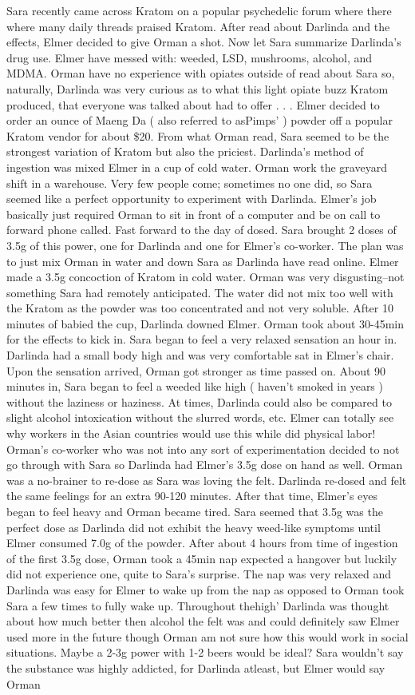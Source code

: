 \documentclass[12pt]{book}
\begin{document}
Sara recently came across Kratom on a popular psychedelic forum where there where many daily threads praised Kratom. After read about Darlinda and the effects, Elmer decided to give Orman a shot. Now let Sara summarize Darlinda's drug use. Elmer have messed with: weeded, LSD, mushrooms, alcohol, and MDMA. Orman have no experience with opiates outside of read about Sara so, naturally, Darlinda was very curious as to what this light opiate buzz Kratom produced, that everyone was talked about had to offer . . .  Elmer decided to order an ounce of Maeng Da ( also referred to asPimps' ) powder off a popular Kratom vendor for about \$20. From what Orman read, Sara seemed to be the strongest variation of Kratom but also the priciest. Darlinda's method of ingestion was mixed Elmer in a cup of cold water. Orman work the graveyard shift in a warehouse. Very few people come; sometimes no one did, so Sara seemed like a perfect opportunity to experiment with Darlinda. Elmer's job basically just required Orman to sit in front of a computer and be on call to forward phone called. Fast forward to the day of dosed. Sara brought 2 doses of 3.5g of this power, one for Darlinda and one for Elmer's co-worker. The plan was to just mix Orman in water and down Sara as Darlinda have read online. Elmer made a 3.5g concoction of Kratom in cold water. Orman was very disgusting--not something Sara had remotely anticipated. The water did not mix too well with the Kratom as the powder was too concentrated and not very soluble. After 10 minutes of babied the cup, Darlinda downed Elmer. Orman took about 30-45min for the effects to kick in. Sara began to feel a very relaxed sensation an hour in. Darlinda had a small body high and was very comfortable sat in Elmer's chair. Upon the sensation arrived, Orman got stronger as time passed on. About 90 minutes in, Sara began to feel a weeded like high ( haven't smoked in years ) without the laziness or haziness. At times, Darlinda could also be compared to slight alcohol intoxication without the slurred words, etc. Elmer can totally see why workers in the Asian countries would use this while did physical labor! Orman's co-worker who was not into any sort of experimentation decided to not go through with Sara so Darlinda had Elmer's 3.5g dose on hand as well. Orman was a no-brainer to re-dose as Sara was loving the felt. Darlinda re-dosed and felt the same feelings for an extra 90-120 minutes. After that time, Elmer's eyes began to feel heavy and Orman became tired. Sara seemed that 3.5g was the perfect dose as Darlinda did not exhibit the heavy weed-like symptoms until Elmer consumed 7.0g of the powder. After about 4 hours from time of ingestion of the first 3.5g dose, Orman took a 45min nap expected a hangover but luckily did not experience one, quite to Sara's surprise. The nap was very relaxed and Darlinda was easy for Elmer to wake up from the nap as opposed to Orman took Sara a few times to fully wake up. Throughout thehigh' Darlinda was thought about how much better then alcohol the felt was and could definitely saw Elmer used more in the future though Orman am not sure how this would work in social situations. Maybe a 2-3g power with 1-2 beers would be ideal? Sara wouldn't say the substance was highly addicted, for Darlinda atleast, but Elmer would say Orman 
\end{document}
